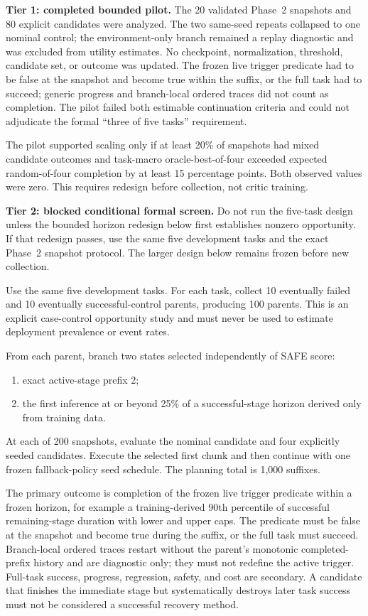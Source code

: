 \textbf{Tier 1: completed bounded pilot.} The 20 validated Phase~2 snapshots and 80 explicit candidates were analyzed. The two same-seed repeats collapsed to one nominal control; the environment-only branch remained a replay diagnostic and was excluded from utility estimates. No checkpoint, normalization, threshold, candidate set, or outcome was updated. The frozen live trigger predicate had to be false at the snapshot and become true within the suffix, or the full task had to succeed; generic progress and branch-local ordered traces did not count as completion. The pilot failed both estimable continuation criteria and could not adjudicate the formal ``three of five tasks'' requirement.

The pilot supported scaling only if at least 20\% of snapshots had mixed candidate outcomes and task-macro oracle-best-of-four exceeded expected random-of-four completion by at least 15 percentage points. Both observed values were zero. This requires redesign before collection, not critic training.

\textbf{Tier 2: blocked conditional formal screen.} Do not run the five-task design unless the bounded horizon redesign below first establishes nonzero opportunity. If that redesign passes, use the same five development tasks and the exact Phase~2 snapshot protocol. The larger design below remains frozen before new collection.

Use the same five development tasks. For each task, collect 10 eventually failed and 10 eventually successful-control parents, producing 100 parents. This is an explicit case-control opportunity study and must never be used to estimate deployment prevalence or event rates.

From each parent, branch two states selected independently of SAFE score:
\begin{enumerate}
  \item exact active-stage prefix 2;
  \item the first inference at or beyond 25\% of a successful-stage horizon derived only from training data.
\end{enumerate}
At each of 200 snapshots, evaluate the nominal candidate and four explicitly seeded candidates. Execute the selected first chunk and then continue with one frozen fallback-policy seed schedule. The planning total is 1,000 suffixes.

The primary outcome is completion of the frozen live trigger predicate within a frozen horizon, for example a training-derived 90th percentile of successful remaining-stage duration with lower and upper caps. The predicate must be false at the snapshot and become true during the suffix, or the full task must succeed. Branch-local ordered traces restart without the parent's monotonic completed-prefix history and are diagnostic only; they must not redefine the active trigger. Full-task success, progress, regression, safety, and cost are secondary. A candidate that finishes the immediate stage but systematically destroys later task success must not be considered a successful recovery method.

